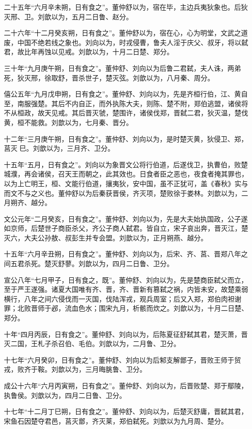 \documentclass[]{article}
\begin{document}
二十五年``六月辛未朔，日有食之''。董仲舒以为，宿在毕，主边兵夷狄象也。后狄灭邢、卫。刘歆以为，五月二日鲁、赵分。

二十六年``十二月癸亥朔，日有食之''。董仲舒以为，宿在心，心为明堂，文武之道废，中国不绝若线之象也。刘向以为，时戎侵曹，鲁夫人淫于庆父、叔牙，将以弑君，故比年再蚀以见戒。刘歆以为，十月二日楚、郑分。

三十年``九月庚午朔，日有食之''。董仲舒、刘向以为后鲁二君弑，夫人诛，两弟死，狄灭邢，徐取舒，晋杀世子，楚灭弦。刘歆以为，八月秦、周分。

僖公五年``九月戊申朔，日有食之''。董仲舒、刘向以为，先是齐桓行伯，江、黄自至，南服强楚。其后不内自正，而外执陈大夫，则陈、楚不附，郑伯逃盟，诸侯将不从桓政，故天见戒。其后晋灭虢，楚围许，诸侯伐郑，晋弑二君，狄灭温，楚伐黄，桓不能救。刘歆以为，七月秦、晋分。

十二年``三月庚午朔，日有食之''。董仲舒、刘向以为，是时楚灭黄，狄侵卫、郑，莒灭巳。刘歆以为，三月齐、卫分。

十五年``五月，日有食之''。刘向以为象晋文公将行伯道，后遂伐卫，执曹伯，败楚城濮，再会诸侯，召天王而朝之，此其效也。日食者臣之恶也，夜食者掩其罪也，以为上亡明王，桓、文能行伯道，攘夷狄，安中国，虽不正犹可，盖《春秋》实与而文不与之义也。董仲舒以为后秦获晋侯，齐灭项，楚败徐于娄林。刘歆以为，二月朔齐、越分。

文公元年``二月癸亥，日有食之''。董仲舒、刘向以为，先是大夫始执国政，公子遂如京师，后楚世子商臣杀父，齐公子商人弑君。皆自立，宋子哀出奔，晋灭江，楚灭六，大夫公孙敖、叔彭生并专会盟。刘歆以为，正月朔燕、越分。

十五年``六月辛丑朔，日有食之''。董仲舒、刘向以为，后宋、齐、莒、晋郑八年之间五君杀死。楚灭舒蓼。刘歆以为，四月二日鲁、卫分。

宣公八年``七月甲子，日有食之，既''。董仲舒、刘向以为，先是楚商臣弑父而立，至于严王遂强。诸夏大国唯有齐、晋，齐、晋新有篡弑之祸，内皆未安，故楚乘弱横行，八年之间六侵伐而一灭国，伐陆浑戎，观兵周室；后又入郑，郑伯肉袒谢罪；北败晋师于邲，流血色水；围宋九月，析骸而炊之。刘歆以为，十月二日楚、郑分。

十年``四月丙辰，日有食之''。董仲舒、刘向以为，后陈夏征舒弑其君，楚灭萧，晋灭二国，王札子杀召伯、毛伯。刘歆以为，二月鲁、卫分。

十七年``六月癸卯，日有食之''。董仲舒、刘向以为后邾支解鄫子，晋败王师于贸戎，败齐于鞍。刘歆以为，三月晦朓鲁、卫分。

成公十六年``六月丙寅朔，日有食之''。董仲舒、刘向以为，后晋败楚、郑于鄢陵，执鲁侯。刘歆以为，四月二日鲁、卫分。

十七年``十二月丁巳朔，日有食之''。董仲舒、刘向以为，后楚灭舒庸，晋弑其君，宋鱼石因楚夺君邑，莒灭鄫，齐灭莱，郑伯弑死。刘歆以为九月周、楚分。
\end{document}
